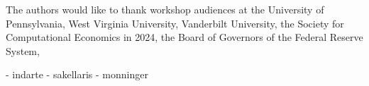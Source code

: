 The authors would like to thank workshop audiences at the University of Pennsylvania, West Virginia University, Vanderbilt University, the Society for Computational Economics in 2024, the Board of Governors of the Federal Reserve System, 

- indarte
- sakellaris
- monninger
